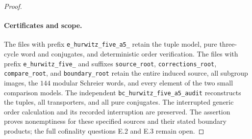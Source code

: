 \begin{proof}
\paragraph{Certificates and scope.}
The files with prefix \texttt{e\_hurwitz\_five\_a5\_}
retain the tuple model, pure three-cycle word and
conjugates, and deterministic order verification.
The files with prefix \texttt{e\_hurwitz\_five\_}
and suffixes \texttt{source\_root},
\texttt{corrections\_root}, \texttt{compare\_root},
and \texttt{boundary\_root} retain the entire induced
source, all subgroup images, the $144$ modular
Schreier words, and every element of the two small
comparison models.  The independent
\texttt{bc\_hurwitz\_five\_a5\_audit} reconstructs
the tuples, all transporters, and all pure conjugates.
The interrupted generic order calculation and its
recorded interruption are preserved.
The assertion proves nonemptiness for these specified
sources and their stated boundary products; the
full cofinality questions E.2 and E.3 remain open.
\end{proof}
